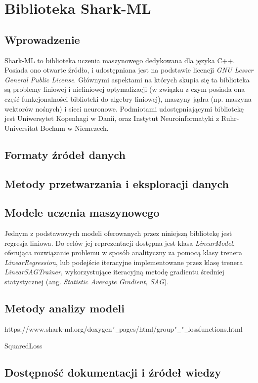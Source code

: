 \chapter{Biblioteka Shark-ML}

\section{Wprowadzenie}

Shark-ML to biblioteka uczenia maszynowego dedykowana dla języka C++. Posiada ono otwarte źródło, i udostępniana jest na podstawie licencji \textit{GNU Lesser General Public License}. Głównymi aspektami na których skupia się ta biblioteka są problemy liniowej i nieliniowej optymalizacji (w związku z czym posiada ona część funkcjonalności biblioteki do algebry liniowej), maszyny jądra (np. maszyna wektorów nośnych) i sieci neuronowe. \cite{shark} Podmiotami udostępniającymi bibliotekę jest Uniwersytet Kopenhagi w Danii, oraz Instytut Neuroinformatyki z Ruhr-Universitat Bochum w Niemczech.

\section{Formaty źródeł danych}
\section{Metody przetwarzania i eksploracji danych}
\section{Modele uczenia maszynowego}

Jednym z podstawowych modeli oferowanych przez niniejszą bibliotekę jest regresja liniowa. Do celów jej reprezentacji dostępna jest klasa \textit{LinearModel}, oferująca rozwiązanie problemu w sposób analityczny za pomocą klasy trenera \textit{LinearRegression}, lub podejście iteracyjne implementowane przez klasę trenera \textit{LinearSAGTrainer}, wykorzystujące iteracyjną metodę gradientu średniej statystycznej (ang. \textit{Statistic Averagte Gradient, SAG}).

\section{Metody analizy modeli}

https://www.shark-ml.org/doxygen\texttt{\char`_}pages/html/group\texttt{\char`_}\texttt{\char`_}lossfunctions.html

SquaredLoss

\section{Dostępność dokumentacji i źródeł wiedzy}
